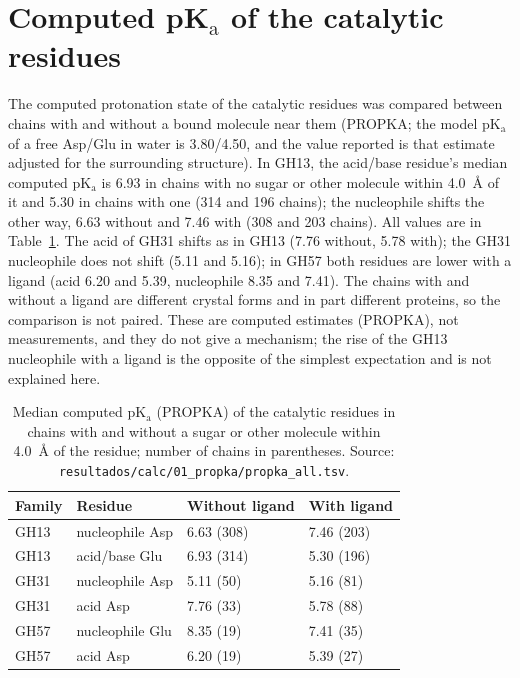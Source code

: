 \documentclass[preprint,12pt]{elsarticle}
\begin{document}
\section{Computed pK$_\mathrm{a}$ of the catalytic residues}
The computed protonation state of the catalytic residues was compared between chains with
and without a bound molecule near them (PROPKA; the model pK$_\mathrm{a}$ of a free Asp/Glu in water is
3.80/4.50, and the value reported is that estimate adjusted for the surrounding
structure). In GH13, the acid/base residue's median computed pK$_\mathrm{a}$ is 6.93 in
chains with no sugar or other molecule within 4.0~\AA{} of it and 5.30 in chains with one
(314 and 196 chains); the nucleophile shifts the other way, 6.63 without and 7.46 with (308
and 203 chains). All values are in Table~\ref{tab:propka}. The acid of GH31 shifts as in GH13 (7.76
without, 5.78 with); the GH31 nucleophile does not shift (5.11 and 5.16); in GH57 both
residues are lower with a ligand (acid 6.20 and 5.39, nucleophile 8.35 and 7.41). The
chains with and without a ligand are different crystal forms and in part different proteins,
so the comparison is not paired. These are computed estimates (PROPKA), not measurements,
and they do not give a mechanism; the rise of the GH13 nucleophile with a ligand is the
opposite of the simplest expectation and is not explained here.

\begin{table}[h]
\centering\small
\caption{Median computed pK$_\mathrm{a}$ (PROPKA) of the catalytic residues in chains with
and without a sugar or other molecule within 4.0~\AA{} of the residue; number of chains in
parentheses. Source: \texttt{resultados/calc/01\_propka/propka\_all.tsv}.}
\label{tab:propka}
\begin{tabular}{llll}
\toprule
Family & Residue & Without ligand & With ligand\\
\midrule
GH13 & nucleophile Asp & 6.63 (308) & 7.46 (203)\\
GH13 & acid/base Glu & 6.93 (314) & 5.30 (196)\\
GH31 & nucleophile Asp & 5.11 (50) & 5.16 (81)\\
GH31 & acid Asp & 7.76 (33) & 5.78 (88)\\
GH57 & nucleophile Glu & 8.35 (19) & 7.41 (35)\\
GH57 & acid Asp & 6.20 (19) & 5.39 (27)\\
\bottomrule
\end{tabular}
\end{table}
\end{document}
